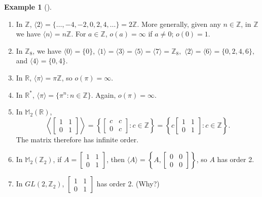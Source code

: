\documentclass[10pt,openany,oneside]{book}
\theoremstyle{plain}
\theoremstyle{definition}
\theoremstyle{definition}
\theoremstyle{definition}
\newtheorem{example}[theorem]{Example}
\theoremstyle{definition}
\numberwithin{equation}{section}
\def\Z{\mathbb{Z}}
\def\R{\mathbb{R}}
\def\M{\mathbb{M}}
\newcommand{\amp}{&}
\begin{document}
\begin{example}[]\label{csexs}
\leavevmode%
\begin{enumerate}
\item\hypertarget{li-251}{}In \(\Z\), \(\langle 2\rangle =\{\ldots,-4,-2,0,2,4,\ldots\}=2\Z\). More generally, given any \(n\in \Z\), in \(\Z\) we have \(\langle n\rangle =n\Z\). For \(a\in \Z\), \(o(a)=\infty\) if \(a\neq 0\); \(o(0)=1\).%
\item\hypertarget{li-252}{}In \(\Z_8\), we have \(\langle 0\rangle =\{0\}\), \(\langle 1\rangle =\langle 3\rangle =\langle 5\rangle =\langle 7\rangle =\Z_8,\) \(\langle 2\rangle =\langle 6\rangle =\{0,2,4,6\},\) and \(\langle 4\rangle =\{0,4\}\).%
\item\hypertarget{li-253}{}In \(\R\), \(\langle \pi\rangle =\pi\Z\), so \(o(\pi)=\infty\).%
\item\hypertarget{li-254}{}In \(\R^*\), \(\langle \pi\rangle =\{\pi^n:n\in \Z\}\). Again, \(o(\pi)=\infty\).%
\item\hypertarget{li-255}{}In \(\M_2(\R)\),%
\begin{equation*}
\left\langle
\begin{bmatrix}
1 \amp  1 \\
0 \amp  1
\end{bmatrix}\right\rangle =\left\{
\begin{bmatrix}
c \amp  c \\
0 \amp  c
\end{bmatrix}
: c\in \Z \right\}= \left\{c
\begin{bmatrix}
1 \amp  1 \\
0 \amp  1
\end{bmatrix}
: c\in \Z \right\}.
\end{equation*}
The matrix therefore has infinite order.%
\item\hypertarget{li-256}{}In \(\M_2(\Z_2)\), if \(A=
\begin{bmatrix}
1 \amp  1 \\
0 \amp  1
\end{bmatrix} \), then \(\langle A\rangle =\left\{A, \begin{bmatrix}0\amp 0 \\ 0\amp 0\end{bmatrix}\right\}\), so \(A\) has order 2.%
\item\hypertarget{li-257}{}In \(GL(2,\Z_2)\), \(\begin{bmatrix}
1 \amp  1 \\
0 \amp  1
\end{bmatrix} \) has order 2. (Why?)%

\end{enumerate}
\end{example}
\end{document}
